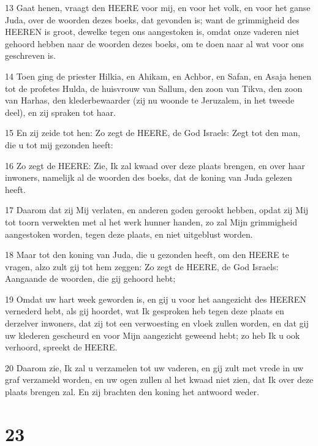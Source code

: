 \par 13 Gaat henen, vraagt den HEERE voor mij, en voor het volk, en voor het ganse Juda, over de woorden dezes boeks, dat gevonden is; want de grimmigheid des HEEREN is groot, dewelke tegen ons aangestoken is, omdat onze vaderen niet gehoord hebben naar de woorden dezes boeks, om te doen naar al wat voor ons geschreven is.
\par 14 Toen ging de priester Hilkia, en Ahikam, en Achbor, en Safan, en Asaja henen tot de profetes Hulda, de huisvrouw van Sallum, den zoon van Tikva, den zoon van Harhas, den klederbewaarder (zij nu woonde te Jeruzalem, in het tweede deel), en zij spraken tot haar.
\par 15 En zij zeide tot hen: Zo zegt de HEERE, de God Israels: Zegt tot den man, die u tot mij gezonden heeft:
\par 16 Zo zegt de HEERE: Zie, Ik zal kwaad over deze plaats brengen, en over haar inwoners, namelijk al de woorden des boeks, dat de koning van Juda gelezen heeft.
\par 17 Daarom dat zij Mij verlaten, en anderen goden gerookt hebben, opdat zij Mij tot toorn verwekten met al het werk hunner handen, zo zal Mijn grimmigheid aangestoken worden, tegen deze plaats, en niet uitgeblust worden.
\par 18 Maar tot den koning van Juda, die u gezonden heeft, om den HEERE te vragen, alzo zult gij tot hem zeggen: Zo zegt de HEERE, de God Israels: Aangaande de woorden, die gij gehoord hebt;
\par 19 Omdat uw hart week geworden is, en gij u voor het aangezicht des HEEREN vernederd hebt, als gij hoordet, wat Ik gesproken heb tegen deze plaats en derzelver inwoners, dat zij tot een verwoesting en vloek zullen worden, en dat gij uw klederen gescheurd en voor Mijn aangezicht geweend hebt; zo heb Ik u ook verhoord, spreekt de HEERE.
\par 20 Daarom zie, Ik zal u verzamelen tot uw vaderen, en gij zult met vrede in uw graf verzameld worden, en uw ogen zullen al het kwaad niet zien, dat Ik over deze plaats brengen zal. En zij brachten den koning het antwoord weder.

\chapter{23}

